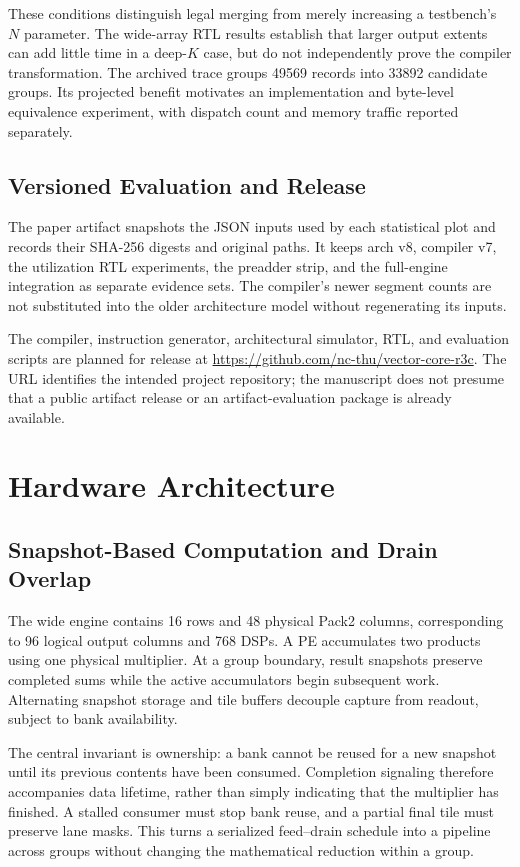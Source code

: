 \documentclass[10pt,conference,letterpaper]{IEEEtran}
\begin{document}
These conditions distinguish legal merging from merely increasing a testbench's $N$ parameter. The wide-array RTL results establish that larger output extents can add little time in a deep-$K$ case, but do not independently prove the compiler transformation. The archived trace groups 49569 records into 33892 candidate groups. Its projected benefit motivates an implementation and byte-level equivalence experiment, with dispatch count and memory traffic reported separately.

\subsection{Versioned Evaluation and Release}
The paper artifact snapshots the JSON inputs used by each statistical plot and records their SHA-256 digests and original paths. It keeps arch v8, compiler v7, the utilization RTL experiments, the preadder strip, and the full-engine integration as separate evidence sets. The compiler's newer segment counts are not substituted into the older architecture model without regenerating its inputs.

The compiler, instruction generator, architectural simulator, RTL, and evaluation scripts are planned for release at \url{https://github.com/nc-thu/vector-core-r3c}. The URL identifies the intended project repository; the manuscript does not presume that a public artifact release or an artifact-evaluation package is already available.


\section{Hardware Architecture}
\subsection{Snapshot-Based Computation and Drain Overlap}
The wide engine contains 16 rows and 48 physical Pack2 columns, corresponding to 96 logical output columns and 768 DSPs. A PE accumulates two products using one physical multiplier. At a group boundary, result snapshots preserve completed sums while the active accumulators begin subsequent work. Alternating snapshot storage and tile buffers decouple capture from readout, subject to bank availability.

The central invariant is ownership: a bank cannot be reused for a new snapshot until its previous contents have been consumed. Completion signaling therefore accompanies data lifetime, rather than simply indicating that the multiplier has finished. A stalled consumer must stop bank reuse, and a partial final tile must preserve lane masks. This turns a serialized feed--drain schedule into a pipeline across groups without changing the mathematical reduction within a group.
\end{document}
